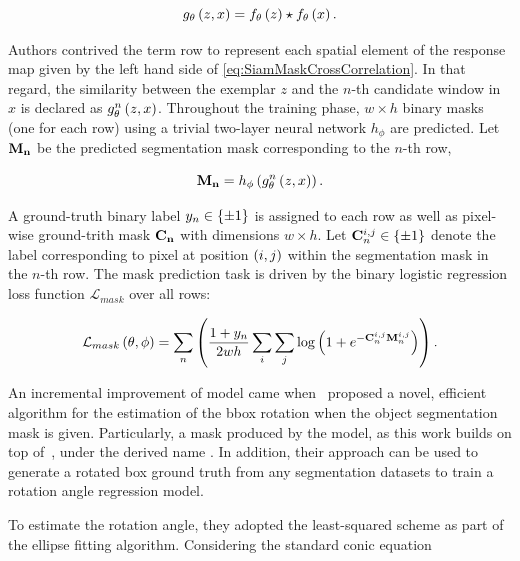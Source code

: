 \begin{equation}
    \label{eq:SiamMaskCrossCorrelation}
    {g_\theta} \left( z, x \right) = {f_\theta} \left( z \right) \star {f_\theta} \left( x \right).
\end{equation}

\noindent Authors contrived the term \gls{row} to represent each spatial element of the response map given by the left hand side of \cref{eq:SiamMaskCrossCorrelation}. In that regard, the similarity between the exemplar $z$ and the $n$-th candidate window in $x$ is declared as ${{g}_{\theta}^{n}} \left( z, x \right)$. Throughout the training phase, $w \times h$ binary masks (one for each \gls{row}) using a trivial two-layer neural network $h_\phi$ are predicted. Let $\mathbf{M_n}$ be the predicted segmentation mask corresponding to the $n$-th \gls{row},

\begin{equation}
    \mathbf{M_n} = {h_\phi} \left( {{g}_{\theta}^{n}} \left( z, x \right) \right).
\end{equation}

\noindent A ground-truth binary label $y_n \in \left\{ {\pm 1} \right\}$ is assigned to each \gls{row} as well as pixel-wise ground-trith mask $\mathbf{C_n}$ with dimensions $w \times h$. Let $\mathbf{C}_n^{i,j} \in \left\{ {\pm 1} \right\}$ denote the label corresponding to pixel at position $\left( {i, j} \right)$ within the segmentation mask in the $n$-th \gls{row}. The mask prediction task is driven by the binary logistic regression loss function $\mathcal{L}_{mask}$ over all \glspl{row}:

\begin{equation}
    {\mathcal{L}_{mask}} \left( \theta, \phi \right) =
    \sum_n
    \left( {
        \frac{1 + y_n}{2wh}
        \sum_{i}
        \sum_{j}
        {\log} \left( 1 + e^{-\mathbf{C}_n^{i,j} \mathbf{M}_n^{i,j}} \right)
    } \right).
\end{equation}

An incremental improvement of  model came when~\cite{Chen2019} proposed a novel, efficient algorithm for the estimation of the \gls{bbox} rotation when the object segmentation mask is given. Particularly, a mask produced by the  model, as this work builds on top of~\cite{Wang2019}, under the derived name . In addition, their approach can be used to generate a rotated box ground truth from any segmentation datasets to train a rotation angle regression model.

To estimate the rotation angle, they adopted the least-squared scheme as part of the ellipse fitting algorithm. Considering the standard conic equation

